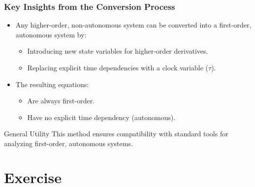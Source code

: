 \documentclass{beamer}
\begin{document}
\begin{frame}
\frametitle{Key Insights from the Conversion Process}

\begin{itemize}
    \item Any higher-order, non-autonomous system can be converted into a first-order, autonomous system by:
    \begin{itemize}
        \item Introducing new state variables for higher-order derivatives.
        \item Replacing explicit time dependencies with a clock variable (\(\tau\)).
    \end{itemize}
    \item The resulting equations:
    \begin{itemize}
        \item Are always first-order.
        \item Have no explicit time dependency (autonomous).
    \end{itemize}
\end{itemize}

\begin{block}{General Utility}
This method ensures compatibility with standard tools for analyzing first-order, autonomous systems.
\end{block}

\end{frame}

\section{Exercise}
\end{document}
